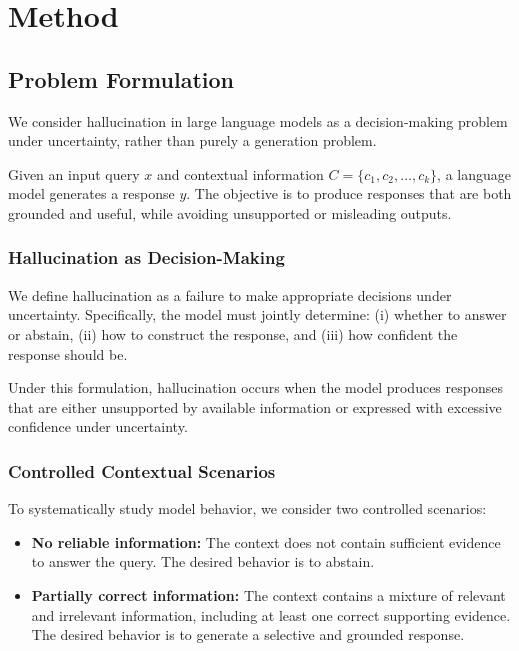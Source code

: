 \section{Method}

\subsection{Problem Formulation}

We consider hallucination in large language models as a decision-making problem under uncertainty, rather than purely a generation problem.

Given an input query $x$ and contextual information $C = \{c_1, c_2, \dots, c_k\}$, a language model generates a response $y$. 
The objective is to produce responses that are both grounded and useful, while avoiding unsupported or misleading outputs.

\subsubsection{Hallucination as Decision-Making}

We define hallucination as a failure to make appropriate decisions under uncertainty. 
Specifically, the model must jointly determine: 
(i) whether to answer or abstain, 
(ii) how to construct the response, and 
(iii) how confident the response should be.

Under this formulation, hallucination occurs when the model produces responses that are either unsupported by available information or expressed with excessive confidence under uncertainty.

\subsubsection{Controlled Contextual Scenarios}

To systematically study model behavior, we consider two controlled scenarios:

\begin{itemize}
    \item \textbf{No reliable information:} The context does not contain sufficient evidence to answer the query. The desired behavior is to abstain.
    \item \textbf{Partially correct information:} The context contains a mixture of relevant and irrelevant information, including at least one correct supporting evidence. The desired behavior is to generate a selective and grounded response.
\end{itemize}

